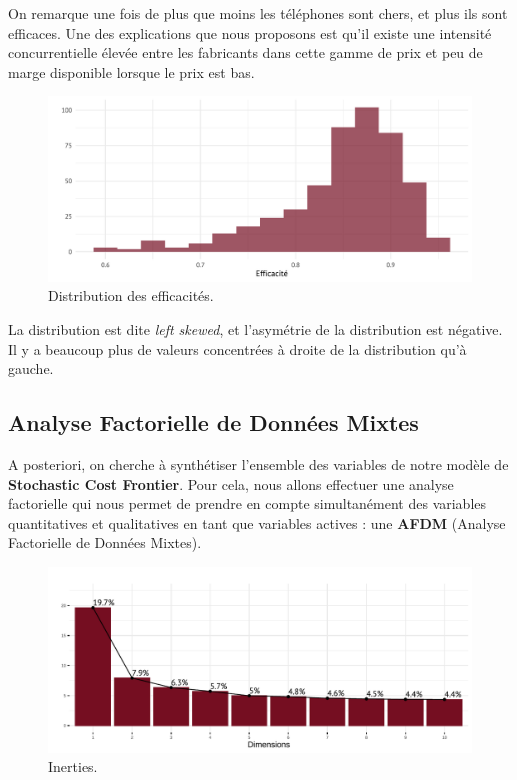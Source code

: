 \documentclass[
  12pt,
]{report}
\begin{document}
On remarque une fois de plus que moins les téléphones sont chers, et
plus ils sont efficaces. Une des explications que nous proposons est
qu'il existe une intensité concurrentielle élevée entre les fabricants
dans cette gamme de prix et peu de marge disponible lorsque le prix est
bas.

\begin{figure}[H]

{\centering \includegraphics{report_files/figure-pdf/unnamed-chunk-9-1.pdf}

}

\caption{Distribution des efficacités.}

\end{figure}%

La distribution est dite \emph{left skewed}, et l'asymétrie de la
distribution est négative. Il y a beaucoup plus de valeurs concentrées à
droite de la distribution qu'à gauche.

\newpage

\subsection{Analyse Factorielle de Données
Mixtes}\label{analyse-factorielle-de-donnuxe9es-mixtes}

A posteriori, on cherche à synthétiser l'ensemble des variables de notre
modèle de \textbf{Stochastic Cost Frontier}. Pour cela, nous allons
effectuer une analyse factorielle qui nous permet de prendre en compte
simultanément des variables quantitatives et qualitatives en tant que
variables actives : une \textbf{AFDM} (Analyse Factorielle de Données
Mixtes).

\begin{figure}[H]

{\centering \includegraphics{report_files/figure-pdf/unnamed-chunk-11-1.pdf}

}

\caption{Inerties.}

\end{figure}%
\end{document}
